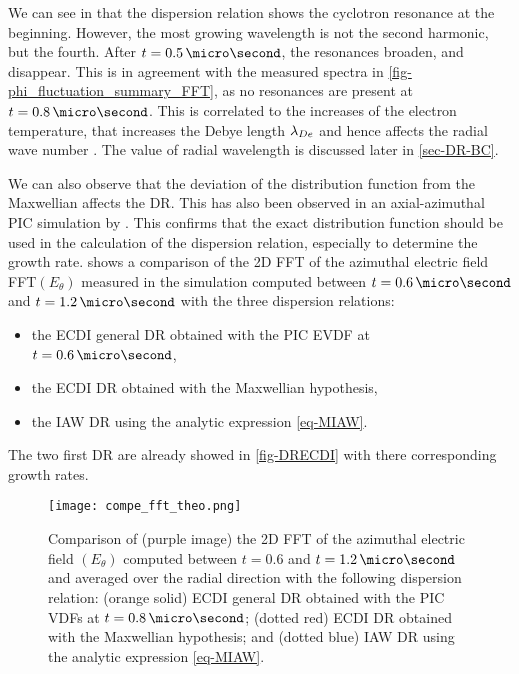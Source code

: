     We can see in  that the dispersion relation shows the cyclotron resonance at the beginning.
    However, the most growing wavelength is not the second harmonic, but the fourth.
    After $t=0.5\,\micro\second$, the resonances broaden, and disappear.
    This is in agreement with the measured spectra in \cref{fig-phi_fluctuation_summary_FFT}, as no resonances are present at $t=0.8\,\micro\second$.
    This is correlated to the increases of the electron temperature, that increases the Debye length $\lambda_{De}$ and hence affects the radial wave number \citep{lafleur2016a,ducrocq2006,cavalier2013}.
    The value of radial wavelength is discussed later in \cref{sec-DR-BC}.
    
    
    We can also observe that the deviation of the distribution function from the Maxwellian affects the \ac{DR}.
    This has also been observed in an axial-azimuthal \ac{PIC} simulation by \citet{lafleur2018}.
    This confirms that the exact distribution function should be used in the calculation of the dispersion relation, especially to determine the growth rate.
     shows a comparison of the \ac{2D} \ac{FFT} of the azimuthal electric field FFT$(E_{\theta})$ measured in the simulation computed between  $t=0.6\,\micro\second$ and $t=1.2\,\micro\second$  with the three dispersion relations\string:
    \begin{itemize}
      \item the \ac{ECDI} general \ac{DR} obtained with the \ac{PIC} \ac{EVDF} at $t=0.6\,\micro\second$,
      \item the \ac{ECDI} \ac{DR} obtained with the Maxwellian hypothesis,
      \item the \ac{IAW} \ac{DR} using the analytic expression \cref{eq-MIAW}. 
    \end{itemize}
    The two first \ac{DR} are already showed in \cref{fig-DRECDI} with there corresponding growth rates.

    \begin{figure}[!hbt]
      \centering
      \texttt{[image: compe\_fft\_theo.png]}
      \caption{Comparison of (purple image) the \acs{2D} \acs{FFT} of the azimuthal electric field $(E_{\theta})$ computed between  $t=0.6$ and $t=1.2\,\micro\second$ and averaged over the radial direction with the following dispersion relation\string: (orange solid) \acs{ECDI} general \acs{DR} obtained with the \acs{PIC} VDFs at $t=0.8\,\micro\second$; (dotted red) \acs{ECDI} \acs{DR} obtained with the Maxwellian hypothesis; and (dotted blue) \acs{IAW} \acs{DR} using the analytic expression \cref{eq-MIAW}.   }
      \label{fig-DR_and_fft}
    \end{figure}
    
